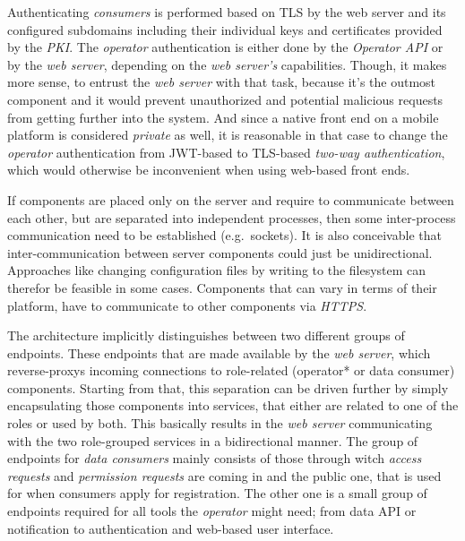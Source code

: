 \documentclass[12pt,english,a4paper,titlepage,cleardoublepage=empty,dottedtoc]{report}
\begin{document}
Authenticating \emph{consumers} is performed based on TLS by the web
server and its configured subdomains including their individual keys and
certificates provided by the \emph{PKI}. The \emph{operator}
authentication is either done by the \emph{Operator API} or by the
\emph{web server}, depending on the \emph{web server's} capabilities.
Though, it makes more sense, to entrust the \emph{web server} with that
task, because it's the outmost component and it would prevent
unauthorized and potential malicious requests from getting further into
the system. And since a native front end on a mobile platform is
considered \emph{private} as well, it is reasonable in that case to
change the \emph{operator} authentication from JWT-based to TLS-based
\emph{two-way authentication}, which would otherwise be inconvenient
when using web-based front ends.

If components are placed only on the server and require to communicate
between each other, but are separated into independent processes, then
some inter-process communication need to be established (e.g.~sockets).
It is also conceivable that inter-communication between server
components could just be unidirectional. Approaches like changing
configuration files by writing to the filesystem can therefor be
feasible in some cases. Components that can vary in terms of their
platform, have to communicate to other components via \emph{HTTPS}.

The architecture implicitly distinguishes between two different groups
of endpoints. These endpoints that are made available by the \emph{web
server}, which reverse-proxys incoming connections to role-related
(operator* or data consumer) components. Starting from that, this
separation can be driven further by simply encapsulating those
components into services, that either are related to one of the roles or
used by both. This basically results in the \emph{web server}
communicating with the two role-grouped services in a bidirectional
manner. The group of endpoints for \emph{data consumers} mainly consists
of those through witch \emph{access requests} and \emph{permission
requests} are coming in and the public one, that is used for when
consumers apply for registration. The other one is a small group of
endpoints required for all tools the \emph{operator} might need; from
data API or notification to authentication and web-based user interface.
\end{document}
